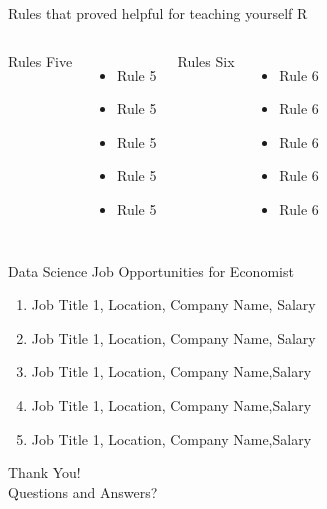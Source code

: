 \documentclass{beamer}
\begin{document}
\begin{frame}[t]{Rules that proved helpful for teaching yourself R}
	\scriptsize
	
	\begin{columns}[t] 
		 {Rules Five}
		\begin{itemize}
			\item Rule 5
			\item   Rule 5
			\item   Rule 5
			\item  Rule 5
			\item  Rule 5
		\end{itemize}
		
		 {Rules Six}
		\begin{itemize}
			\item Rule 6
			\item   Rule 6
			\item   Rule 6
			\item  Rule 6
			\item  Rule 6
		\end{itemize}	
		
	\end{columns}		
	
\end{frame}

\begin{frame}[t]{Data Science Job Opportunities for Economist}
	
	
	\begin{enumerate}
		\item Job Title 1, Location, Company Name, Salary
		\item  Job Title 1, Location, Company Name, Salary
		\item  Job Title 1, Location, Company Name,Salary
		\item Job Title 1, Location, Company Name,Salary
		\item Job Title 1, Location, Company Name,Salary
	\end{enumerate}
\end{frame}

\begingroup
{}
\begin{frame} [c] { }
	
    \centering
	\large  Thank You! \\
	\centering
	\bigskip
	Questions and Answers?	
\end{frame}
\endgroup

	
\end{document}
